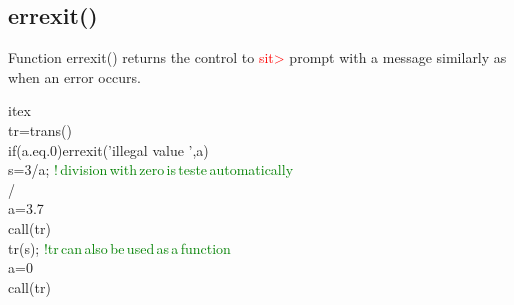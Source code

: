 \subsection{\textcolor{VioletRed}{errexit}()}
\label{errexit}
Function \textcolor{VioletRed}{errexit}() returns the control to \textcolor{Red}{sit>} prompt with a message similarly
as when an error occurs.
\begin{example}[errexitex]itex\\
\label{errexitex}
tr=\textcolor{VioletRed}{trans}()\\
\textcolor{VioletRed}{if}(a.eq.0)\textcolor{VioletRed}{errexit}('illegal value ',a)\\
s=3/a; \textcolor{green}{!\,division\,with\,zero\,is\,teste\,automatically}\\
/\\
a=3.7\\
\textcolor{VioletRed}{call}(tr)\\
tr(s); \textcolor{green}{!tr\,can\,also\,be\,used\,as\,a\,function}\\
a=0\\
\textcolor{VioletRed}{call}(tr)
\end{example}
